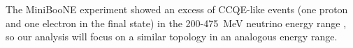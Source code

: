 
The MiniBooNE experiment showed an excess of CCQE-like events (one proton and one electron in the final state) in the 200-475~MeV neutrino energy range \cite{miniboone}, so our analysis will focus on a similar topology in an analogous energy range.